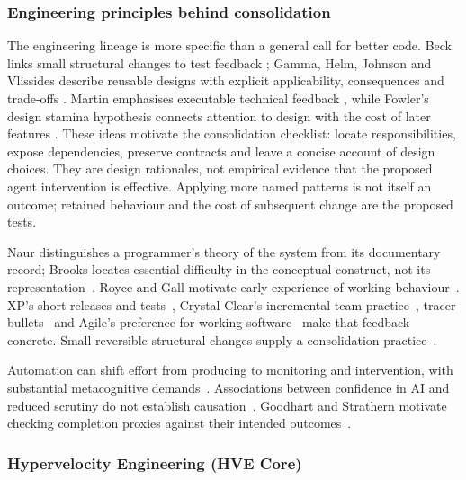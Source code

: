 \subsubsection{Engineering principles behind consolidation}\label{sup:sec:theory}

The engineering lineage is more specific than a general call for better
code. Beck links small structural changes to test feedback
\cite{beck2002tdd,beck2023tidy}; Gamma, Helm, Johnson and Vlissides describe
reusable designs with explicit applicability, consequences and trade-offs
\cite{gamma1995patterns}. Martin emphasises executable technical feedback
\cite{martin2026productengineers}, while Fowler's design stamina hypothesis
connects attention to design with the cost of later features
\cite{fowler2007stamina}. These ideas motivate the consolidation checklist:
locate responsibilities, expose dependencies, preserve contracts and leave
a concise account of design choices. They are design rationales, not
empirical evidence that the proposed agent intervention is effective.
Applying more named patterns is not itself an outcome; retained behaviour
and the cost of subsequent change are the proposed tests.

Naur distinguishes a programmer's theory of the system from its documentary
record; Brooks locates essential difficulty in the conceptual construct,
not its representation~\cite{naur1985theory,brooks1987silver}. Royce and Gall
motivate early experience of working behaviour~\cite{royce1970,gall1975}.
XP's short releases and tests~\cite{beck2004xp,beck2002tdd}, Crystal Clear's
incremental team practice~\cite{cockburn2004crystal}, tracer
bullets~\cite{hunt1999pragmatic} and Agile's preference for working
software~\cite{agile2001manifesto} make that feedback concrete.
Small reversible structural changes supply a consolidation
practice~\cite{beck2023tidy}.

Automation can shift effort from producing to monitoring and intervention,
with substantial metacognitive demands~\cite{bainbridge1983ironies,simkute2024ironies,tankelevitch2024metacognitive}.
Associations between confidence in AI and reduced scrutiny do not establish
causation~\cite{lee2025critical}. Goodhart and Strathern motivate checking
completion proxies against their intended outcomes~\cite{goodhart1975,strathern1997improving}.

\subsubsection{Hypervelocity Engineering (HVE Core)}\label{sup:sec:hve}

